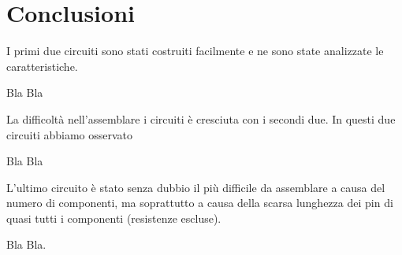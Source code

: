 \section{Conclusioni}

I primi due circuiti sono stati costruiti facilmente e ne sono state analizzate le caratteristiche.

Bla Bla

La difficoltà nell'assemblare i circuiti è cresciuta con i secondi due. In questi due circuiti abbiamo osservato

Bla Bla

L'ultimo circuito è stato senza dubbio il più difficile da assemblare a causa del numero di componenti, ma soprattutto a causa della scarsa lunghezza dei pin di quasi tutti i componenti (resistenze escluse).

Bla Bla.